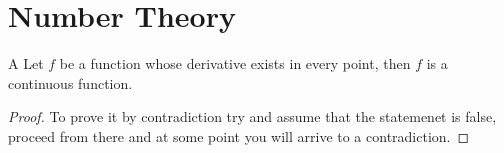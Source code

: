 \section{Number Theory}


\begin{theorem}{A}
    Let $f$ be a function whose derivative exists in every point, then $f$
    is a continuous function.
\end{theorem}

\begin{proof}
    To prove it by contradiction try and assume that the statemenet is false,
    proceed from there and at some point you will arrive to a contradiction.
\end{proof}